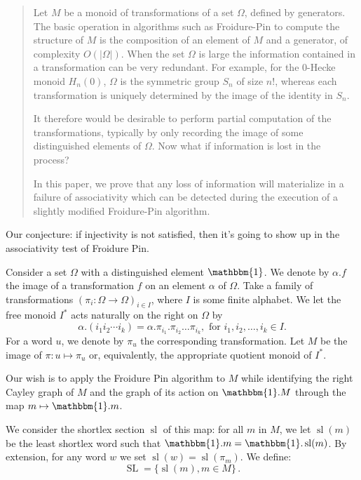\documentclass[12pt]{amsart}
\renewcommand{\sl}{\operatorname{sl}}
\newcommand{\SL}{\operatorname{SL}}
\newcommand{\p}{\mathbbm{1}} %
\begin{document}
\begin{abstract}
  Let $M$ be a monoid of transformations of a set $\Omega$, defined by
  generators. The basic operation in algorithms such as Froidure-Pin
  to compute the structure of $M$ is the composition of an element of
  $M$ and a generator, of complexity $O(|\Omega|)$. When the set $\Omega$
  is large the information contained in a transformation can be very
  redundant. For example, for the $0$-Hecke monoid $H_n(0)$, $\Omega$ is
  the symmetric group $S_n$ of size $n!$, whereas each transformation
  is uniquely determined by the image of the identity in $S_n$.

  It therefore would be desirable to perform partial computation of
  the transformations, typically by only recording the image of some
  distinguished elements of $\Omega$. Now what if information is lost
  in the process?

  In this paper, we prove that any loss of information will
  materialize in a failure of associativity which can be detected
  during the execution of a slightly modified Froidure-Pin algorithm.
\end{abstract}

Our conjecture: if injectivity is not satisfied, then it's going to
show up in the associativity test of Froidure Pin.



Consider a set $\Omega$ with a distinguished element $\p$. We denote
by $\alpha.f$ the image of a transformation $f$ on an element $\alpha$
of $\Omega$. Take a family of transformations
$(\pi_i: \Omega \to \Omega)_{i\in I}$, where $I$ is some finite
alphabet. We let the free monoid $I^*$ acts naturally on the right on
$\Omega$ by
\begin{displaymath}
  \alpha.(i_1i_2\cdots i_k) = \alpha.\pi_{i_1}.\pi_{i_2}\ldots
  \pi_{i_k}, \text{ for } i_1,i_2,\ldots,i_k\in I.
\end{displaymath}
For a word $u$, we denote by $\pi_u$ the corresponding transformation.
Let $M$ be the image of $\pi: u\mapsto \pi_u$ or, equivalently, the
appropriate quotient monoid of $I^*$.

Our wish is to apply the Froidure Pin algorithm to $M$ while
identifying the right Cayley graph of $M$ and the graph of its action
on $\p.M$ through the map $m \mapsto \p.m$.

We consider the shortlex section $\sl$ of this map: for all $m$ in
$M$, we let $\sl(m)$ be the least shortlex word such that
$\p.m = \p.\sl(m)$. By extension, for any word $w$ we set
$\sl(w)=\sl(\pi_m)$. We define:
\begin{displaymath}
  \SL = \{ \sl(m),  m \in M \}\,.
\end{displaymath}
\end{document}
